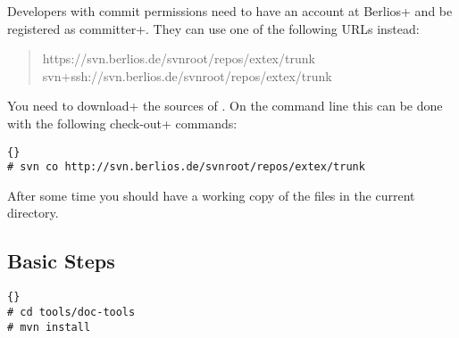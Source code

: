 Developers with commit permissions need to have an account at
\+Berlios+ and be registered as \+committer+. They can use one of the
following URLs instead:

\begin{quotation}
  https://svn.berlios.de/svnroot/repos/extex/trunk
  svn+ssh://svn.berlios.de/svnroot/repos/extex/trunk
\end{quotation}

You need to \+download+ the sources of \ExTeX. On the command line
this can be done with the following \+check-out+ commands:

\begin{lstlisting}{}
# svn co http://svn.berlios.de/svnroot/repos/extex/trunk
\end{lstlisting}

After some time you should have a working copy of the files in the
current directory.

\subsection{Basic Steps}


\begin{lstlisting}{}
# cd tools/doc-tools
# mvn install
\end{lstlisting}



%
%
%

